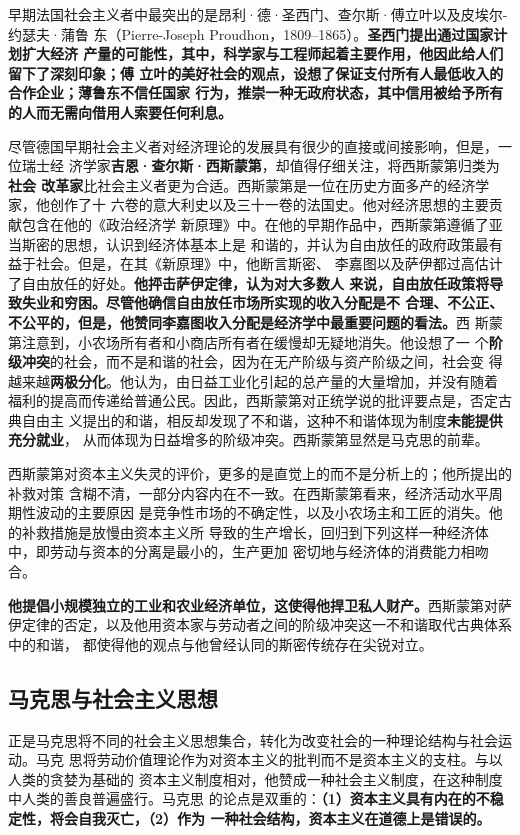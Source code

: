 早期法国社会主义者中最突出的是昂利·德·圣西门、查尔斯·傅立叶以及皮埃尔-约瑟夫·蒲鲁
东（Pierre-Joseph Proudhon，1809--1865）。\textbf{圣西门提出通过国家计划扩大经济
  产量的可能性，其中，科学家与工程师起着主要作用，他因此给人们留下了深刻印象；傅
  立叶的美好社会的观点，设想了保证支付所有人最低收入的合作企业；薄鲁东不信任国家
  行为，推崇一种无政府状态，其中信用被给予所有的人而无需向借用人索要任何利息。}

尽管德国早期社会主义者对经济理论的发展具有很少的直接或间接影响，但是，一位瑞士经
济学家\textbf{吉恩·查尔斯·西斯蒙第}，却值得仔细关注，将西斯蒙第归类为\textbf{社会
  改革家}比社会主义者更为合适。西斯蒙第是一位在历史方面多产的经济学家，他创作了十
六卷的意大利史以及三十一卷的法国史。他对经济思想的主要贡献包含在他的《政治经济学
新原理》中。在他的早期作品中，西斯蒙第遵循了亚当斯密的思想，认识到经济体基本上是
和谐的，并认为自由放任的政府政策最有益于社会。但是，在其《新原理》中，他断言斯密、
李嘉图以及萨伊都过高估计了自由放任的好处。\textbf{他抨击萨伊定律，认为对大多数人
  来说，自由放任政策将导致失业和穷困。尽管他确信自由放任市场所实现的收入分配是不
  合理、不公正、不公平的，但是，他赞同李嘉图收入分配是经济学中最重要问题的看法。}西
斯蒙第注意到，小农场所有者和小商店所有者在缓慢却无疑地消失。他设想了一
个\textbf{阶级冲突}的社会，而不是和谐的社会，因为在无产阶级与资产阶级之间，社会变
得越来越\textbf{两极分化}。他认为，由日益工业化引起的总产量的大量增加，并没有随着
福利的提高而传递给普通公民。因此，西斯蒙第对正统学说的批评要点是，否定古典自由主
义提出的和谐，相反却发现了不和谐，这种不和谐体现为制度\textbf{未能提供充分就业}，
从而体现为日益增多的阶级冲突。西斯蒙第显然是马克思的前辈。

西斯蒙第对资本主义失灵的评价，更多的是直觉上的而不是分析上的；他所提出的补救对策
含糊不清，一部分内容内在不一致。在西斯蒙第看来，经济活动水平周期性波动的主要原因
是竞争性市场的不确定性，以及小农场主和工匠的消失。他的补救措施是放慢由资本主义所
导致的生产增长，回归到下列这样一种经济体中，即劳动与资本的分离是最小的，生产更加
密切地与经济体的消费能力相吻合。

\textbf{他提倡小规模独立的工业和农业经济单位，这使得他捍卫私人财产。}西斯蒙第对萨
伊定律的否定，以及他用资本家与劳动者之间的阶级冲突这一不和谐取代古典体系中的和谐，
都使得他的观点与他曾经认同的斯密传统存在尖锐对立。

\subsection{马克思与社会主义思想}

正是马克思将不同的社会主义思想集合，转化为改变社会的一种理论结构与社会运动。马克
思将劳动价值理论作为对资本主义的批判而不是资本主义的支柱。与以人类的贪婪为基础的
资本主义制度相对，他赞成一种社会主义制度，在这种制度中人类的善良普遍盛行。马克思
的论点是双重的：\textbf{（1）资本主义具有内在的不稳定性，将会自我灭亡，（2）作为
  一种社会结构，资本主义在道德上是错误的。}

